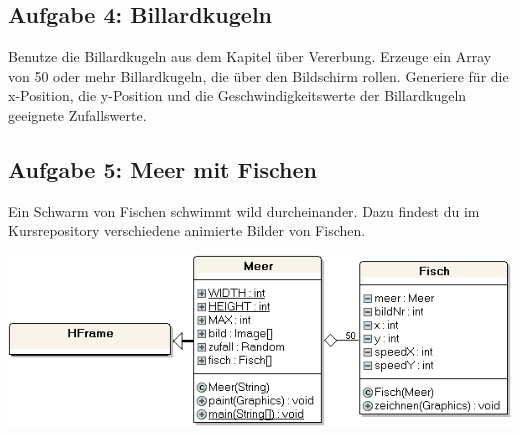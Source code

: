 \subsection{Aufgabe 4: Billardkugeln}

Benutze die Billardkugeln aus dem Kapitel über Vererbung. Erzeuge ein Array
von 50 oder mehr Billardkugeln, die über den Bildschirm rollen. Generiere für
die x-Position, die y-Position und die Geschwindigkeitswerte der Billardkugeln
geeignete Zufallswerte.


\subsection{Aufgabe 5: Meer mit Fischen}

Ein Schwarm von Fischen schwimmt wild durcheinander. Dazu findest du im
Kursrepository verschiedene animierte Bilder von Fischen.

\includegraphics[width=1.0\textwidth]{./inf/SEKII/18_Java_Arrays/Aufgabe5a.png}


